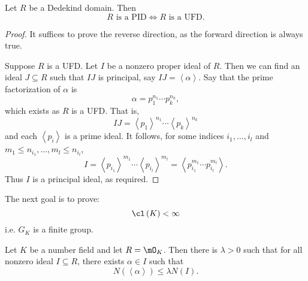 \documentclass[pmath441]{subfiles}
\begin{document}
    \begin{prop}{}
        Let $R$ be a Dedekind domain. Then
        \begin{equation*}
            R\text{ is a PID} \iff R\text{ is a UFD}.
        \end{equation*}
    \end{prop}

    \begin{proof}
        It suffices to prove the reverse direction, as the forward direction is always true.

        Suppose $R$ is a UFD. Let $I$ be a nonzero proper ideal of $R$. Then we can find an ideal $J\subseteq R$ such that $IJ$ is principal, say $IJ=\left< \alpha \right>$. Say that the prime factorization of $\alpha$ is
        \begin{equation*}
            \alpha = p_1^{n_1}\cdots p_k^{n_k},
        \end{equation*}
        which exists as $R$ is a UFD. That is,
        \begin{equation*}
            IJ = \left< p_1 \right>^{n_1}\cdots\left< p_k \right>^{n_k}  
        \end{equation*}
        and each $\left< p_i \right>$ is a prime ideal. It follows, for some indices $i_1,\ldots,i_l$ and $m_1\leq n_{i_1},\ldots,m_l\leq n_{i_l}$,
        \begin{equation*}
            I = \left< p_{i_1} \right>^{m_1}\cdots\left< p_{i_l} \right>^{m_l} = \left< p_{i_1}^{m_1}\cdots p_{i_l}^{m_l} \right>.   
        \end{equation*}
        Thus $I$ is a principal ideal, as required.
    \end{proof}
    
    \np The next goal is to prove:
    \begin{equation*}
        \cl\left( K \right) < \infty
    \end{equation*}
    i.e. $G_K$ is a finite group.

    \clearpage
    
    \begin{prop}{}
        Let $K$ be a number field and let $R=\mO_K$. Then there is $\lambda>0$ such that for all nonzero ideal $I\subseteq R$, there exists $\alpha\in I$ such that
        \begin{equation*}
            N\left( \left< \alpha \right> \right) \leq \lambda N\left( I \right).
        \end{equation*}
        \vspace{-22pt}
    \end{prop}
    \rruleline
\end{document}
